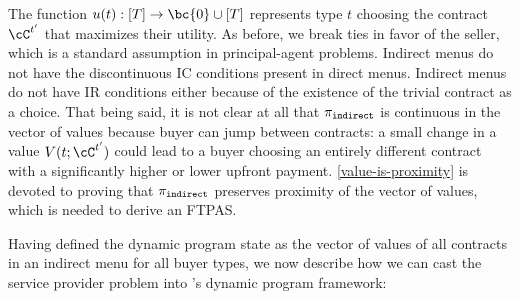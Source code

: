 
The function $u(t):[T]\to \bc{0}\cup [T]$ represents type $t$ choosing the contract $\cC^{t'}$ that maximizes their utility. As before, we break ties in favor of the seller, which is a standard assumption in principal-agent problems. Indirect menus do not have the discontinuous IC conditions present in direct menus. Indirect menus do not have IR conditions either because of the existence of the trivial contract as a choice. That being said, it is not clear at all that $\pi_{\tt{indirect}}$ is continuous in the vector of values because buyer can jump between contracts: a small change in a value $V(t;\cC^{t'})$ could lead to a buyer choosing an entirely different contract with a significantly higher or lower upfront payment. \cref{value-is-proximity} is devoted to proving that $\pi_{\tt{indirect}}$ preserves proximity of the vector of values, which is needed to derive an FTPAS.



Having defined the dynamic program state as the vector of values of all contracts in an indirect menu for all buyer types, we now describe how we can cast the service provider problem into \citet{woeginger2000}'s dynamic program framework:

